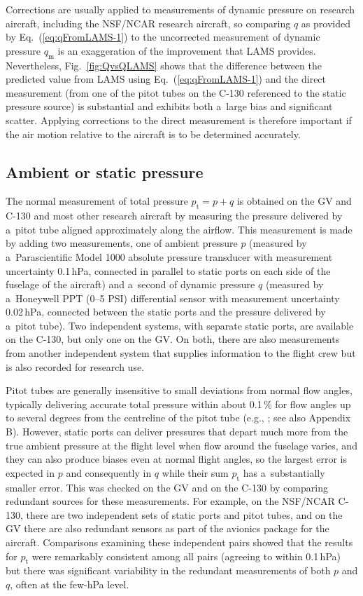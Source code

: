 \documentclass[amtd, online, hvmath]{copernicus}
\begin{document}
Corrections are usually applied to measurements of dynamic pressure on
research aircraft, including the NSF/NCAR research aircraft, so
comparing $q$ as provided by Eq.~(\ref{eq:qFromLAMS-1}) to the
uncorrected measurement of dynamic pressure $q_{\mathrm{m}}$ is an exaggeration
of the improvement that LAMS provides. Nevertheless,
Fig.~\ref{fig:QvsQLAMS} shows that the difference between the
predicted value from LAMS using Eq.~(\ref{eq:qFromLAMS-1}) and the
direct measurement (from one of the pitot tubes on the C-130
referenced to the static pressure source) is substantial and exhibits
both a~large bias and significant scatter. Applying corrections to the
direct measurement is therefore important if the air motion relative
to the aircraft is to be determined accurately.

\subsection{Ambient or static pressure}

The normal measurement of total pressure $p_{\mathrm{t}}=p+q$ is
obtained on the GV and C-130 and most other research aircraft by
measuring the pressure delivered by a~pitot tube aligned approximately
along the airflow. This measurement is made by adding two
measurements, one of ambient pressure $p$ (measured by
a~Parascientific Model 1000 absolute pressure transducer with
measurement uncertainty 0.1\,hPa, connected in parallel to static
ports on each side of the fuselage of the aircraft) and a~second of
dynamic pressure $q$ (measured by a~Honeywell PPT (0--5 PSI)
differential sensor with measurement uncertainty 0.02\,hPa, connected
between the static ports and the pressure delivered by a~pitot
tube). Two independent systems, with separate static ports, are
available on the C-130, but only one on the GV. On both, there are
also measurements from another independent system that supplies
information to the flight crew but is also recorded for research use.

Pitot tubes are generally insensitive to small deviations from normal
flow angles, typically delivering accurate total pressure within about
0.1\,{\%} for flow angles up to several degrees from the centreline of
the pitot tube (e.g.,
\citealp{NACATN2331,balachandran2006fundamentals,springerhdbk2007};
see also Appendix B). However, static ports can deliver \mbox{pressures} that
depart much more from the true ambient pressure at the flight level
when flow around the fuselage varies, and they can also produce biases
even at normal flight angles, so the largest error is expected in $p$
and consequently in $q$ while their sum $p_{\mathrm{t}}$ has
a~substantially smaller error. This was checked on the GV and on the
C-130 by comparing redundant sources for these measurements. For
example, on the NSF/NCAR C-130, there are two independent sets of
static ports and pitot tubes, and on the GV there are also redundant
sensors as part of the avionics package for the aircraft.  Comparisons
examining these independent pairs showed that the results for
$p_{\mathrm{t}}$ were remarkably consistent among all pairs (agreeing
to within 0.1\,hPa) but there was significant variability in the
redundant measurements of both $p$ and $q$, often at the few-hPa
level.
\end{document}
